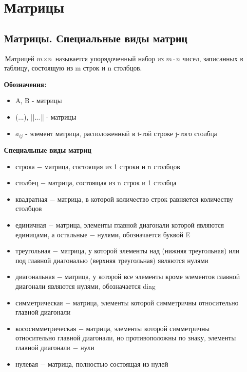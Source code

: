 \section{Матрицы}

\subsection{Матрицы. Специальные виды матриц}

\begin{definition}
	$\textit{Матрицей m$\times$n}$ называется упорядоченный набор из $m \cdot n$ чисел, записанных в таблицу, состоящую из m строк и n столбцов.
\end{definition}



\textbf{Обозначения:}
\begin{itemize}
	\item A, B - матрицы
	\item (...), ||...|| - матрицы
	\item $a_{ij}$ - элемент матрица, расположенный в i-той строке j-того столбца
\end{itemize}


\textbf{Специальные виды матриц}
\begin{itemize}
	\item $\textit{строка}$ $-$ матрица, состоящая из 1 строки и n столбцов
	\item $\textit{столбец}$ $-$ матрица, состоящая из n строк и 1 столбца
	\item $\textit{квадратная}$ $-$ матрица, в которой количество строк равняется количеству столбцов
	\item $\textit{единичная}$ $-$ матрица, элементы главной диагонали которой являются единицами, а остальные $-$ нулями, обозначается буквой E
	\item $\textit{треугольная}$ $-$ матрица, у которой элементы над (нижняя треугольная) или под главной диагональю (верхняя треугольная) являются нулями
	\item $\textit{диагональная}$ $-$ матрица, у которой все элементы кроме элементов главной диагонали являются нулями, обозначается diag
	\item $\textit{симметрическая}$ $-$ матрица, элементы которой симметричны относительно главной диагонали
	\item $\textit{кососимметрическая}$ $-$ матрица, элементы которой симметричны относительно главной диагонали, но противоположны по знаку, элементы главной диагонали $-$ нули
	\item $\textit{нулевая}$ $-$ матрица, полностью состоящая из нулей
\end{itemize}


